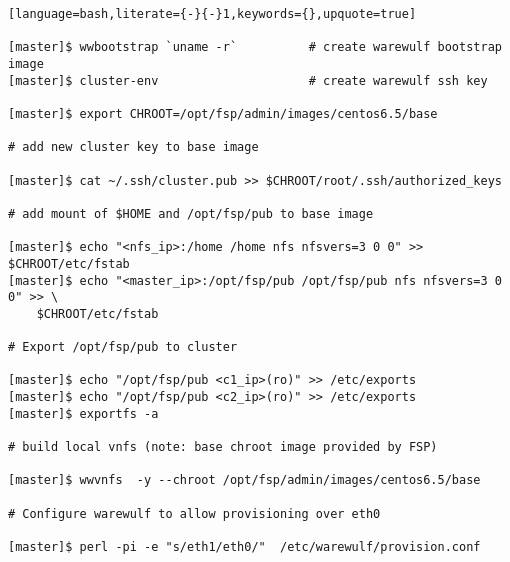 \documentclass[letterpaper]{article}
\begin{document}
\begin{lstlisting}[language=bash,literate={-}{-}1,keywords={},upquote=true]

[master]$ wwbootstrap `uname -r`          # create warewulf bootstrap image
[master]$ cluster-env                     # create warewulf ssh key

[master]$ export CHROOT=/opt/fsp/admin/images/centos6.5/base

# add new cluster key to base image

[master]$ cat ~/.ssh/cluster.pub >> $CHROOT/root/.ssh/authorized_keys

# add mount of $HOME and /opt/fsp/pub to base image

[master]$ echo "<nfs_ip>:/home /home nfs nfsvers=3 0 0" >> $CHROOT/etc/fstab
[master]$ echo "<master_ip>:/opt/fsp/pub /opt/fsp/pub nfs nfsvers=3 0 0" >> \
    $CHROOT/etc/fstab

# Export /opt/fsp/pub to cluster

[master]$ echo "/opt/fsp/pub <c1_ip>(ro)" >> /etc/exports
[master]$ echo "/opt/fsp/pub <c2_ip>(ro)" >> /etc/exports
[master]$ exportfs -a

# build local vnfs (note: base chroot image provided by FSP)

[master]$ wwvnfs  -y --chroot /opt/fsp/admin/images/centos6.5/base

# Configure warewulf to allow provisioning over eth0

[master]$ perl -pi -e "s/eth1/eth0/"  /etc/warewulf/provision.conf 
\end{lstlisting}


\end{document}
